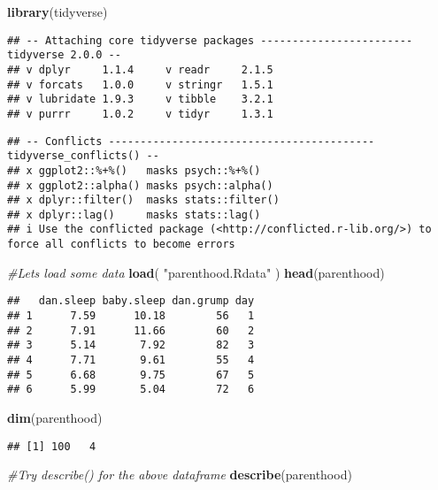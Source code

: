 \documentclass[
]{article}
\newenvironment{Shaded}{\begin{snugshade}}{\end{snugshade}}
\newcommand{\CommentTok}[1]{\textcolor[rgb]{0.56,0.35,0.01}{\textit{#1}}}
\newcommand{\FunctionTok}[1]{\textcolor[rgb]{0.13,0.29,0.53}{\textbf{#1}}}
\newcommand{\NormalTok}[1]{#1}
\newcommand{\StringTok}[1]{\textcolor[rgb]{0.31,0.60,0.02}{#1}}
\begin{document}
\begin{Shaded}
\begin{Highlighting}[]
\FunctionTok{library}\NormalTok{(tidyverse)}
\end{Highlighting}
\end{Shaded}

\begin{verbatim}
## -- Attaching core tidyverse packages ------------------------ tidyverse 2.0.0 --
## v dplyr     1.1.4     v readr     2.1.5
## v forcats   1.0.0     v stringr   1.5.1
## v lubridate 1.9.3     v tibble    3.2.1
## v purrr     1.0.2     v tidyr     1.3.1
\end{verbatim}

\begin{verbatim}
## -- Conflicts ------------------------------------------ tidyverse_conflicts() --
## x ggplot2::%+%()   masks psych::%+%()
## x ggplot2::alpha() masks psych::alpha()
## x dplyr::filter()  masks stats::filter()
## x dplyr::lag()     masks stats::lag()
## i Use the conflicted package (<http://conflicted.r-lib.org/>) to force all conflicts to become errors
\end{verbatim}

\begin{Shaded}
\begin{Highlighting}[]
\CommentTok{\#Let\textquotesingle{}s load some data}
\FunctionTok{load}\NormalTok{( }\StringTok{"parenthood.Rdata"}\NormalTok{ )}
\FunctionTok{head}\NormalTok{(parenthood)}
\end{Highlighting}
\end{Shaded}

\begin{verbatim}
##   dan.sleep baby.sleep dan.grump day
## 1      7.59      10.18        56   1
## 2      7.91      11.66        60   2
## 3      5.14       7.92        82   3
## 4      7.71       9.61        55   4
## 5      6.68       9.75        67   5
## 6      5.99       5.04        72   6
\end{verbatim}

\begin{Shaded}
\begin{Highlighting}[]
\FunctionTok{dim}\NormalTok{(parenthood)}
\end{Highlighting}
\end{Shaded}

\begin{verbatim}
## [1] 100   4
\end{verbatim}

\begin{Shaded}
\begin{Highlighting}[]
\CommentTok{\#Try describe() for the above dataframe}
\FunctionTok{describe}\NormalTok{(parenthood)}
\end{Highlighting}
\end{Shaded}
\end{document}
